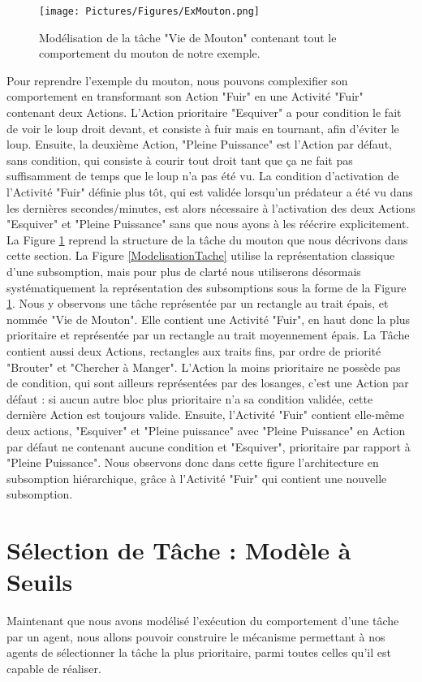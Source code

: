 			\begin{figure}
			\centering
			\texttt{[image: Pictures/Figures/ExMouton.png]}
			\caption{Modélisation de la tâche "Vie de Mouton" contenant tout le comportement du mouton de notre exemple.}
			\label{TacheMouton}
			\end{figure}
			
			Pour reprendre l'exemple du mouton, nous pouvons complexifier son comportement en transformant son Action "Fuir" en une Activité "Fuir" contenant deux Actions. L'Action prioritaire "Esquiver" a pour condition le fait de voir le loup droit devant, et consiste à fuir mais en tournant, afin d'éviter le loup. Ensuite, la deuxième Action, "Pleine Puissance" est l'Action par défaut, sans condition, qui consiste à courir tout droit tant que ça ne fait pas suffisamment de temps que le loup n'a pas été vu. La condition d'activation de l'Activité "Fuir" définie plus tôt, qui est validée lorsqu'un prédateur a été vu dans les dernières secondes/minutes, est alors nécessaire à l'activation des deux Actions "Esquiver" et "Pleine Puissance" sans que nous ayons à les réécrire explicitement. La Figure \ref{TacheMouton} reprend la structure de la tâche du mouton que nous décrivons dans cette section. La Figure \ref{ModelisationTache} utilise la représentation classique d'une subsomption, mais pour plus de clarté nous utiliserons désormais systématiquement la représentation des subsomptions sous la forme de la Figure \ref{TacheMouton}. Nous y observons une tâche représentée par un rectangle au trait épais, et nommée "Vie de Mouton". Elle contient une Activité "Fuir", en haut donc la plus prioritaire et représentée par un rectangle au trait moyennement épais. La Tâche contient aussi deux Actions, rectangles aux traits fins, par ordre de priorité "Brouter" et "Chercher à Manger". L'Action la moins prioritaire ne possède pas de condition, qui sont ailleurs représentées par des losanges, c'est une Action par défaut : si aucun autre bloc plus prioritaire n'a sa condition validée, cette dernière Action est toujours valide. Ensuite, l'Activité "Fuir" contient elle-même deux actions, "Esquiver" et "Pleine puissance" avec "Pleine Puissance" en Action par défaut ne contenant aucune condition et "Esquiver", prioritaire par rapport à "Pleine Puissance". Nous observons donc dans cette figure l'architecture en subsomption hiérarchique, grâce à l'Activité "Fuir" qui contient une nouvelle subsomption.
			
	
			
	\section{Sélection de Tâche : Modèle à Seuils}
		Maintenant que nous avons modélisé l'exécution du comportement d'une tâche par un agent, nous allons pouvoir construire le mécanisme permettant à nos agents de sélectionner la tâche la plus prioritaire, parmi toutes celles qu'il est capable de réaliser.
		
